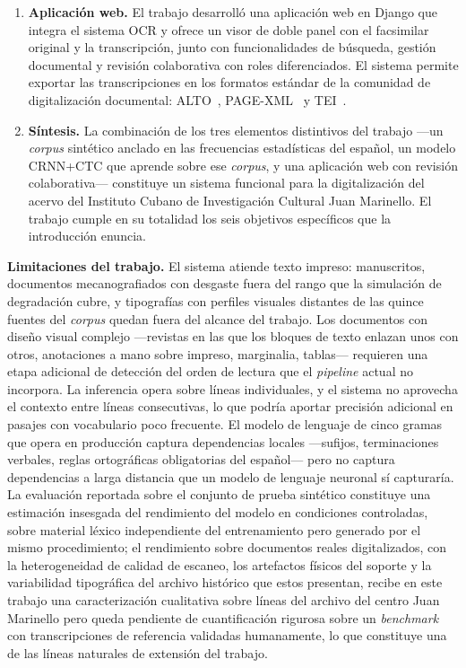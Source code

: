 \begin{enumerate}[leftmargin=*,labelsep=0.5em]
	\item \textbf{Aplicación web.} El trabajo desarrolló una aplicación web en Django que integra el sistema OCR y ofrece un visor de doble panel con el facsimilar original y la transcripción, junto con funcionalidades de búsqueda, gestión documental y revisión colaborativa con roles diferenciados. El sistema permite exportar las transcripciones en los formatos estándar de la comunidad de digitalización documental: ALTO~\cite{loc-alto}, PAGE-XML~\cite{pletschacher2010page} y TEI~\cite{tei-consortium}.
	
	\item \textbf{Síntesis.} La combinación de los tres elementos distintivos del trabajo —un \textit{corpus} sintético anclado en las frecuencias estadísticas del español, un modelo CRNN+CTC que aprende sobre ese \textit{corpus}, y una aplicación web con revisión colaborativa— constituye un sistema funcional para la digitalización del acervo del Instituto Cubano de Investigación Cultural Juan Marinello. El trabajo cumple en su totalidad los seis objetivos específicos que la introducción enuncia.
\end{enumerate}

\noindent\textbf{Limitaciones del trabajo.} El sistema atiende texto impreso: manuscritos, documentos mecanografiados con desgaste fuera del rango que la simulación de degradación cubre, y tipografías con perfiles visuales distantes de las quince fuentes del \textit{corpus} quedan fuera del alcance del trabajo. Los documentos con diseño visual complejo —revistas en las que los bloques de texto enlazan unos con otros, anotaciones a mano sobre impreso, marginalia, tablas— requieren una etapa adicional de detección del orden de lectura que el \textit{pipeline} actual no incorpora. La inferencia opera sobre líneas individuales, y el sistema no aprovecha el contexto entre líneas consecutivas, lo que podría aportar precisión adicional en pasajes con vocabulario poco frecuente. El modelo de lenguaje de cinco gramas que opera en producción captura dependencias locales —sufijos, terminaciones verbales, reglas ortográficas obligatorias del español— pero no captura dependencias a larga distancia que un modelo de lenguaje neuronal sí capturaría. La evaluación reportada sobre el conjunto de prueba sintético constituye una estimación insesgada del rendimiento del modelo en condiciones controladas, sobre material léxico independiente del entrenamiento pero generado por el mismo procedimiento; el rendimiento sobre documentos reales digitalizados, con la heterogeneidad de calidad de escaneo, los artefactos físicos del soporte y la variabilidad tipográfica del archivo histórico que estos presentan, recibe en este trabajo una caracterización cualitativa sobre líneas del archivo del centro Juan Marinello pero queda pendiente de cuantificación rigurosa sobre un \textit{benchmark} con transcripciones de referencia validadas humanamente, lo que constituye una de las líneas naturales de extensión del trabajo.

